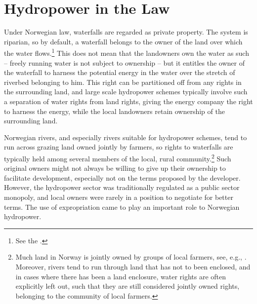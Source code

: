 \section{Hydropower in the Law}\label{sec:hl}

Under Norwegian law, waterfalls are regarded as private property. The system is riparian, so by default, a waterfall belongs to the owner of the land over which the water flows.\footnote{See the \cite[13]{wra00}.} This does not mean that the landowners own the water as such -- freely running water is not subject to ownership -- but it entitles the owner of the waterfall to harness the potential energy in the water over the stretch of riverbed belonging to him. This right can be partitioned off from any rights in the surrounding land, and large scale hydropower schemes typically involve such a separation of water rights from land rights, giving the energy company the right to harness the energy, while the local landowners retain ownership of the surrounding land.

Norwegian rivers, and especially rivers suitable for hydropower schemes, tend to run across grazing land owned jointly by farmers, so rights to waterfalls are typically held among several members of the local, rural community.\footnote{Much land in Norway is jointly owned by groups of local farmers, see, e.g., \cite[570]{stenseth07}. Moreover, rivers tend to run through land that has not to been enclosed, and in cases where there has been a land enclosure, water rights are often explicitly left out, such that they are still considered jointly owned rights, belonging to the community of local farmers.} Such original owners might not always be willing to give up their ownership to facilitate development, especially not on the terms proposed by the developer. However, the hydropower sector was traditionally regulated as a public sector monopoly, and local owners were rarely in a position to negotiate for better terms. The use of expropriation came to play an important role to Norwegian hydropower.




